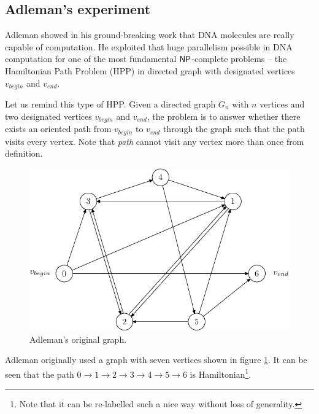 	\subsection{Adleman's experiment}
	\label{sec:adleman}
		
		Adleman showed in his ground-breaking work \cite{adleman94} that DNA molecules are really capable of computation. He exploited that huge parallelism possible in DNA computation for one of the most fundamental $\mathsf{NP}$-complete problems -- the Hamiltonian Path Problem (HPP) in directed graph with designated vertices $v_{begin}$ and $v_{end}$.
		
		Let us remind this type of HPP. Given a directed graph $G_n$ with $n$ vertices and two designated vertices $v_{begin}$ and $v_{end}$, the problem is to answer whether there exists an oriented path from $v_{begin}$ to $v_{end}$ through the graph such that the path visits every vertex. Note that {\em path} cannot visit any vertex more than once from definition.
		
		\begin{figure}[H]
		\begin{center}
			\includegraphics{./figures/adleman_graph.pdf}
			\caption{Adleman's original graph.}
			\label{fig:adleman_graph}
		\end{center}
		\end{figure}
		
		Adleman originally used a graph with seven vertices shown in figure \ref{fig:adleman_graph}. It can be seen that the path $0 \rightarrow 1 \rightarrow 2 \rightarrow 3 \rightarrow 4 \rightarrow 5 \rightarrow 6$ is Hamiltonian\footnote{Note that it can be re-labelled such a nice way without loss of generality.}.
		
